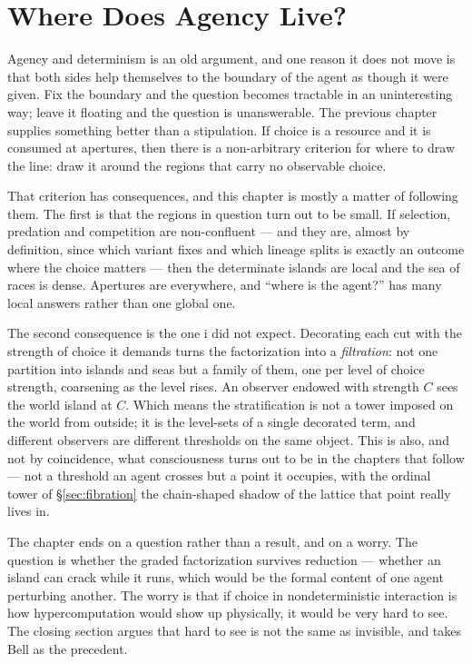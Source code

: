 \chapter{Where Does Agency Live?}
\label{ch:agy}

\noindent
Agency and determinism is an old argument, and one reason it does not move is that
both sides help themselves to the boundary of the agent as though it were given. Fix
the boundary and the question becomes tractable in an uninteresting way; leave it
floating and the question is unanswerable. The previous chapter supplies something
better than a stipulation. If choice is a resource and it is consumed at apertures,
then there is a non-arbitrary criterion for where to draw the line: draw it around the
regions that carry no observable choice.

That criterion has consequences, and this chapter is mostly a matter of following them.
The first is that the regions in question turn out to be small. If selection, predation
and competition are non-confluent --- and they are, almost by definition, since which
variant fixes and which lineage splits is exactly an outcome where the choice matters
--- then the determinate islands are local and the sea of races is dense. Apertures are
everywhere, and ``where is the agent?'' has many local answers rather than one global
one.

The second consequence is the one i did not expect. Decorating each cut with the
strength of choice it demands turns the factorization into a \emph{filtration}: not one
partition into islands and seas but a family of them, one per level of choice strength,
coarsening as the level rises. An observer endowed with strength $C$ sees the world
island at $C$. Which means the stratification is not a tower imposed on the world from
outside; it is the level-sets of a single decorated term, and different observers are
different thresholds on the same object. This is also, and not by coincidence, what
consciousness turns out to be in the chapters that follow --- not a threshold an agent
crosses but a point it occupies, with the ordinal tower of \S\ref{sec:fibration} the
chain-shaped shadow of the lattice that point really lives in.

The chapter ends on a question rather than a result, and on a worry. The question is
whether the graded factorization survives reduction --- whether an island can crack
while it runs, which would be the formal content of one agent perturbing another. The
worry is that if choice in nondeterministic interaction is how hypercomputation would
show up physically, it would be very hard to see. The closing section argues that hard
to see is not the same as invisible, and takes Bell as the precedent.

